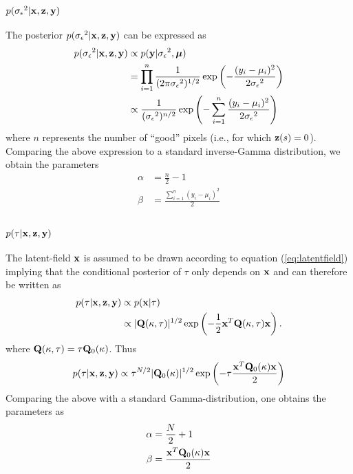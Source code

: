 \documentclass[a4paper,10pt]{article}
\def\bQ{{\bf Q}}
\def\bx{{\bf x}}
\def\by{{\bf y}}
\def\bz{{\bf z}}
\def\bmu{{\boldsymbol \mu}}
\def\sigmaeps{{\sigma_{\epsilon}}}
\begin{document}
\subsubsection{$p(\sigmaeps^2|\bx,\bz,\by)$}
The posterior $p(\sigmaeps^2|\bx,\bz,\by)$ can be expressed as
\begin{align}
 p(\sigmaeps^2|\bx,\bz,\by) &\propto p(\by|\sigmaeps^2, \bmu) \nonumber \\
 &= \prod_{i=1}^n \frac{1}{(2\pi \sigmaeps^2)^{1/2}} \exp \left( -\frac{(y_i - \mu_i)^2}{2\sigmaeps^2} \right) \nonumber \\
 &\propto \frac{1}{(\sigmaeps^2)^{n/2}} \exp \left(- \sum_{i=1}^n \frac{(y_i - \mu_i)^2}{2\sigmaeps^2} \right)
\end{align}
where $n$ represents the number of ``good'' pixels (i.e., for which $\bz(s) = 0$). Comparing the above expression to a standard inverse-Gamma distribution, we obtain the parameters
\begin{align}
 \alpha &= \frac{n}{2}-1 \nonumber \\
 \beta &= \frac{\sum_{i=1}^n(y_i - \mu_i)^2}{2}
\end{align}

\subsubsection{$p(\tau|\bx,\bz,\by)$}
The latent-field $\bx$ is assumed to be drawn according to equation (\ref{eq:latentfield}) implying that the conditional posterior of $\tau$ only depends on $\bx$ and can therefore be written as
\begin{align}
 p(\tau|\bx,\bz,\by) &\propto p(\bx|\tau) \nonumber \\
 &\propto |\bQ(\kappa,\tau)|^{1/2} \exp \left( -\frac{1}{2} \bx^T \bQ(\kappa,\tau) \bx \right).
\end{align}
where $\bQ(\kappa,\tau) = \tau \bQ_0(\kappa)$. Thus
\begin{equation}
 p(\tau|\bx,\bz,\by) \propto \tau^{N/2} |\bQ_0(\kappa)|^{1/2}  \exp \left( - \tau \frac{\bx^T \bQ_0(\kappa) \bx}{2} \right)
\end{equation}
Comparing the above with a standard Gamma-distribution, one obtains the parameters as
\begin{align}
 \alpha &= \frac{N}{2} + 1 \nonumber  \\
 \beta &= \frac{\bx^T \bQ_0(\kappa) \bx}{2}
\end{align}
\end{document}

